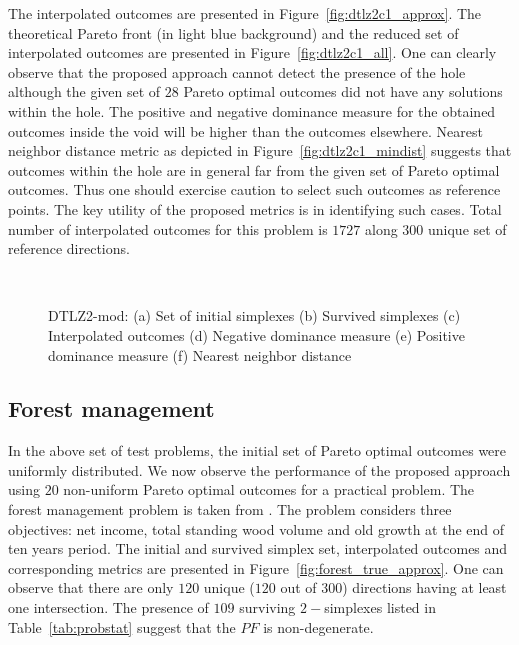 The interpolated outcomes are presented in Figure~\ref{fig:dtlz2c1_approx}. The theoretical Pareto front (in light blue background) and the reduced set of interpolated outcomes are presented in Figure~\ref{fig:dtlz2c1_all}. One can clearly observe that the proposed approach cannot detect the presence of the hole although the given set of $28$ Pareto optimal outcomes did not have any solutions within the hole. The positive and negative dominance measure for the obtained outcomes inside the void will be higher than the outcomes elsewhere. Nearest neighbor distance metric as depicted in Figure~\ref{fig:dtlz2c1_mindist} suggests that outcomes within the hole are in general far from the given set of Pareto optimal outcomes. Thus one should exercise caution to select such outcomes as reference points. The key utility of the proposed metrics is in identifying such cases. Total number of interpolated outcomes for this problem is $1727$ along $300$ unique set of reference directions. 

\begin{figure*}[!ht]
	\centering
	\\
	\caption{DTLZ2-mod: (a) Set of initial {\color{blue}simplexes} (b) Survived {\color{blue}simplexes} (c) Interpolated outcomes (d) Negative dominance measure (e) Positive dominance measure (f) Nearest neighbor distance}
	\label{fig:dtlz2c1_true_approx}
\end{figure*}

\subsection{Forest management}
In the above set of test problems, the initial set of Pareto optimal outcomes were uniformly distributed. We now observe the performance of the proposed approach using $20$ non-uniform Pareto optimal outcomes for a practical problem. The forest management problem is taken from \cite{eyvindson2013towards}. The problem considers three objectives: net income, total standing wood volume and old growth at the end of ten years period. The initial and survived simplex set, interpolated outcomes and corresponding metrics are presented in Figure~\ref{fig:forest_true_approx}. One can observe that there are only $120$ unique ($120$ out of $300$) directions having at least one intersection. The presence of $109$ surviving $2-${\color{blue}simplexes} listed in Table~\ref{tab:probstat} suggest that the $PF$ is non-degenerate.

